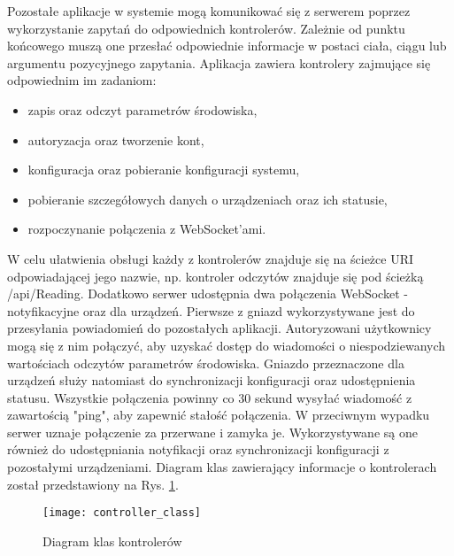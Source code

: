 Pozostałe aplikacje w systemie mogą komunikować się z serwerem poprzez wykorzystanie
zapytań do odpowiednich kontrolerów. Zależnie od punktu końcowego muszą one
przesłać odpowiednie informacje w postaci ciała, ciągu lub argumentu pozycyjnego
zapytania. Aplikacja zawiera kontrolery zajmujące się odpowiednim im zadaniom:
\begin{itemize}
  \item zapis oraz odczyt parametrów środowiska,
  \item autoryzacja oraz tworzenie kont,
  \item konfiguracja oraz pobieranie konfiguracji systemu,
  \item pobieranie szczegółowych danych o urządzeniach oraz ich statusie,
  \item rozpoczynanie połączenia z WebSocket'ami.
\end{itemize}
W celu ułatwienia obsługi każdy z kontrolerów znajduje się na ścieżce URI odpowiadającej
jego nazwie, np. kontroler odczytów znajduje się pod ścieżką /api/Reading.
Dodatkowo serwer udostępnia dwa połączenia WebSocket - notyfikacyjne oraz
dla urządzeń. Pierwsze z gniazd wykorzystywane jest do przesyłania
powiadomień do pozostałych aplikacji. Autoryzowani użytkownicy mogą
się z nim połączyć, aby uzyskać dostęp do wiadomości o niespodziewanych
wartościach odczytów parametrów środowiska. Gniazdo przeznaczone dla
urządzeń służy natomiast do synchronizacji konfiguracji oraz
udostępnienia statusu. Wszystkie połączenia powinny co 30 sekund
wysyłać wiadomość z zawartością "ping", aby zapewnić stałość połączenia.
W przeciwnym wypadku serwer uznaje połączenie za przerwane i zamyka je.
Wykorzystywane są one również do udostępniania notyfikacji oraz
synchronizacji konfiguracji z pozostałymi urządzeniami.
Diagram klas zawierający informacje o kontrolerach został przedstawiony na
Rys. \ref{diagram:controller_class}.
\begin{figure}[h!]
  \centering
  \texttt{[image: controller\_class]}
  \caption{Diagram klas kontrolerów}
  \label{diagram:controller_class}
\end{figure}

